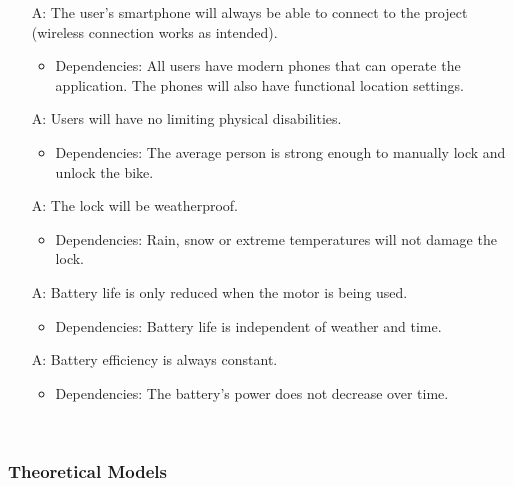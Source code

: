 \documentclass[12pt]{article}
\newcounter{reqnum} %
\begin{document}
\begin{itemize}

\item[A\refstepcounter{reqnum}\thereqnum\label{A1}:]The user’s smartphone will always be able to connect to the project (wireless connection works as intended).
	\begin {itemize}
		\item Dependencies: All users have modern phones that can operate the application. The phones will also have functional location settings.  
	\end {itemize}
	
\item[A\refstepcounter{reqnum}\thereqnum\label{A2}:] Users will have no limiting physical disabilities.
	\begin {itemize}
		\item Dependencies: The average person is strong enough to manually lock and unlock the bike.
	\end {itemize}
	
\item[A\refstepcounter{reqnum}\thereqnum\label{A3}:] The lock will be weatherproof.
	\begin {itemize}
		\item Dependencies: Rain, snow or extreme temperatures will not damage the lock. 
	\end {itemize}
	
\item[A\refstepcounter{reqnum}\thereqnum\label{A4}:]Battery life is only reduced when the motor is being used.
	\begin {itemize} 
		\item Dependencies: Battery life is independent of weather and time.
	\end {itemize}

\item[A\refstepcounter{reqnum}\thereqnum\label{A5}:] Battery efficiency is always constant.
	\begin {itemize}
		\item Dependencies: The battery's power does not decrease over time.
	\end {itemize}

\end{itemize}

~\newpage

\subsubsection{Theoretical Models}\label{sec_theoretical}
\end{document}
